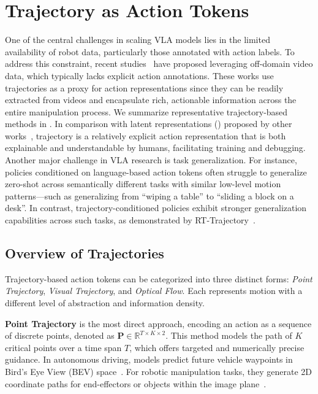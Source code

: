 \documentclass[10pt, a4paper, logo, copyright]{googledeepmind} %
\begin{document}
\section{Trajectory as Action Tokens}
\label{sec:trajectory}

One of the central challenges in scaling VLA models lies in the limited availability of robot data, particularly those annotated with action labels. To address this constraint, recent studies~\cite{wen2023any, ko2023avdc, li2025hamster, xu2024flow} have proposed leveraging off-domain video data, which typically lacks explicit action annotations. These works use trajectories as a proxy for action representations since they can be readily extracted from videos and encapsulate rich, actionable information across the entire manipulation process. We summarize representative trajectory-based methods in . In comparison with latent representations () proposed by other works~\cite{bruce2024genie, ye2024latent, bu2025agibot, cai2023groot, cai2024groot, mete2024quest, shafiullah2022behavior, lee2024behavior}, trajectory is a relatively explicit action representation that is both explainable and understandable by humans, facilitating training and debugging. 
Another major challenge in VLA research is task generalization. For instance, policies conditioned on language-based action tokens often struggle to generalize zero-shot across semantically different tasks with similar low-level motion patterns---such as generalizing from “wiping a table” to “sliding a block on a desk”. In contrast, trajectory-conditioned policies exhibit stronger generalization capabilities across such tasks, as demonstrated by RT-Trajectory~\cite{rt-trajectory}.

\subsection{Overview of Trajectories}

Trajectory-based action tokens can be categorized into three distinct forms: \textit{Point Trajectory}, \textit{Visual Trajectory}, and \textit{Optical Flow}. Each represents motion with a different level of abstraction and information density. 

\textbf{Point Trajectory} is the most direct approach, encoding an action as a sequence of discrete points, denoted as $\mathbf{P} \in \mathbb{R}^{T \times K \times 2}$. This method models the path of $K$ critical points over a time span $T$, which offers targeted and numerically precise guidance. In autonomous driving, models predict future vehicle waypoints in Bird's Eye View (BEV) space~\cite{covla_wacv2025, tian2024drivevlm, hwang2024emma, liu2025vlm}. For robotic manipulation tasks, they generate 2D coordinate paths for end-effectors or objects within the image plane~\cite{wen2023any, flip}. 
\end{document}
